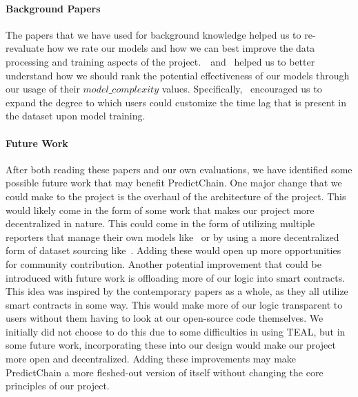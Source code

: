 \documentclass{article}
\begin{document}
    \paragraph{Background Papers}
    The papers that we have used for background knowledge helped us to re-revaluate how we rate our models and how we can best
    improve the data processing and training aspects of the project.~\cite{LSTM}~and~\cite{recurrentModeling} helped
    us to better understand how we should rank the potential effectiveness of our models through our usage of
    their $model\_complexity$ values.  Specifically,~\cite{LSTM} encouraged us to expand the degree to
    which users could customize the time lag that is present in the dataset upon model training.

    \paragraph{Future Work}
    After both reading these papers and our own evaluations, we have identified some possible future work that may
    benefit PredictChain.  One major change that we could make to the project is the overhaul of the architecture of
    the project.  This would likely come in the form of some work that makes our project more decentralized in nature.
    This could come in the form of utilizing multiple reporters that manage their own models like~\cite{windForcasting}
    or by using a more decentralized form of dataset sourcing like~\cite{priceOfTrust}.  Adding these would open up more
    opportunities for community contribution.  Another potential improvement that could be introduced with future work is
    offloading more of our logic into smart contracts.  This idea was inspired by the contemporary papers as a whole, as
    they all utilize smart contracts in some way.  This would make more of our logic transparent to users without them having
    to look at our open-source code themselves.  We initially did not choose to do this due to some difficulties in using TEAL,
    but in some future work, incorporating these into our design would make our project more open and decentralized.
    Adding these improvements may make PredictChain a more fleshed-out version of itself without changing the core
    principles of our project.
\end{document}

